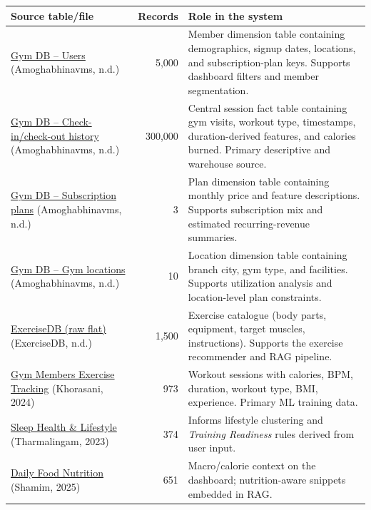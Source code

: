 \documentclass[11pt,a4paper]{article}
\begin{document}
\vspace{-2pt}
\begin{center}
\small
\renewcommand{\arraystretch}{1.1}
\begin{tabularx}{\linewidth}{l r X}
\toprule
\textbf{Source table/file} & \textbf{Records} & \textbf{Role in the system} \\
\midrule
\href{https://www.kaggle.com/datasets/amoghabhinavms/gym-database-management-system}{Gym DB -- Users} (Amoghabhinavms, n.d.) & 5{,}000 & Member dimension table containing demographics, signup dates, locations, and subscription-plan keys. Supports dashboard filters and member segmentation. \\
\href{https://www.kaggle.com/datasets/amoghabhinavms/gym-database-management-system}{Gym DB -- Check-in/check-out history} (Amoghabhinavms, n.d.) & 300{,}000 & Central session fact table containing gym visits, workout type, timestamps, duration-derived features, and calories burned. Primary descriptive and warehouse source. \\
\href{https://www.kaggle.com/datasets/amoghabhinavms/gym-database-management-system}{Gym DB -- Subscription plans} (Amoghabhinavms, n.d.) & 3 & Plan dimension table containing monthly price and feature descriptions. Supports subscription mix and estimated recurring-revenue summaries. \\
\href{https://www.kaggle.com/datasets/amoghabhinavms/gym-database-management-system}{Gym DB -- Gym locations} (Amoghabhinavms, n.d.) & 10 & Location dimension table containing branch city, gym type, and facilities. Supports utilization analysis and location-level plan constraints. \\
\href{https://exercisedb.dev/}{ExerciseDB (raw flat)} (ExerciseDB, n.d.) & 1{,}500 & Exercise catalogue (body parts, equipment, target muscles, instructions). Supports the exercise recommender and RAG pipeline. \\
\href{https://www.kaggle.com/datasets/valakhorasani/gym-members-exercise-dataset}{Gym Members Exercise Tracking} (Khorasani, 2024) & 973 & Workout sessions with calories, BPM, duration, workout type, BMI, experience. Primary ML training data. \\
\href{https://www.kaggle.com/datasets/uom190346a/sleep-health-and-lifestyle-dataset}{Sleep Health \& Lifestyle} (Tharmalingam, 2023) & 374 & Informs lifestyle clustering and \emph{Training Readiness} rules derived from user input. \\
\href{https://www.kaggle.com/datasets/adilshamim8/daily-food-and-nutrition-dataset}{Daily Food Nutrition} (Shamim, 2025) & 651 & Macro/calorie context on the dashboard; nutrition-aware snippets embedded in RAG. \\
\bottomrule
\end{tabularx}
\end{center}
\end{document}

